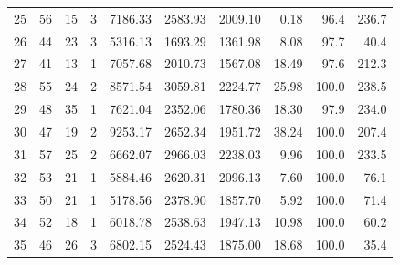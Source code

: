 \begin{longtable}{rrrrrrrrrr}
25 & 56 & 15 & 3 & 7186.33 & 2583.93 & 2009.10 & 0.18 & 96.4 & 236.7 \\
26 & 44 & 23 & 3 & 5316.13 & 1693.29 & 1361.98 & 8.08 & 97.7 & 40.4 \\
27 & 41 & 13 & 1 & 7057.68 & 2010.73 & 1567.08 & 18.49 & 97.6 & 212.3 \\
28 & 55 & 24 & 2 & 8571.54 & 3059.81 & 2224.77 & 25.98 & 100.0 & 238.5 \\
29 & 48 & 35 & 1 & 7621.04 & 2352.06 & 1780.36 & 18.30 & 97.9 & 234.0 \\
30 & 47 & 19 & 2 & 9253.17 & 2652.34 & 1951.72 & 38.24 & 100.0 & 207.4 \\
31 & 57 & 25 & 2 & 6662.07 & 2966.03 & 2238.03 & 9.96 & 100.0 & 233.5 \\
32 & 53 & 21 & 1 & 5884.46 & 2620.31 & 2096.13 & 7.60 & 100.0 & 76.1 \\
33 & 50 & 21 & 1 & 5178.56 & 2378.90 & 1857.70 & 5.92 & 100.0 & 71.4 \\
34 & 52 & 18 & 1 & 6018.78 & 2538.63 & 1947.13 & 10.98 & 100.0 & 60.2 \\
35 & 46 & 26 & 3 & 6802.15 & 2524.43 & 1875.00 & 18.68 & 100.0 & 35.4 \\

\end{longtable}

\endgroup
